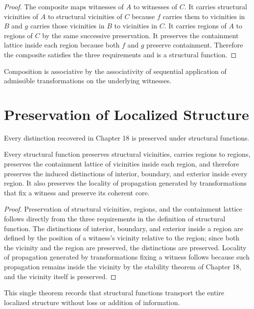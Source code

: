 \documentclass[12pt,anyside]{book}
\begin{document}
\begin{proof}
The composite maps witnesses of $A$ to witnesses of $C$. It carries structural vicinities of $A$ to structural vicinities of $C$ because $f$ carries them to vicinities in $B$ and $g$ carries those vicinities in $B$ to vicinities in $C$. It carries regions of $A$ to regions of $C$ by the same successive preservation. It preserves the containment lattice inside each region because both $f$ and $g$ preserve containment. Therefore the composite satisfies the three requirements and is a structural function.
\end{proof}

Composition is associative by the associativity of sequential application of admissible transformations on the underlying witnesses.

\section{Preservation of Localized Structure}
Every distinction recovered in Chapter 18 is preserved under structural functions.

\begin{theorem}
Every structural function preserves structural vicinities, carries regions to regions, preserves the containment lattice of vicinities inside each region, and therefore preserves the induced distinctions of interior, boundary, and exterior inside every region. It also preserves the locality of propagation generated by transformations that fix a witness and preserve its coherent core.
\end{theorem}

\begin{proof}
Preservation of structural vicinities, regions, and the containment lattice follows directly from the three requirements in the definition of structural function. The distinctions of interior, boundary, and exterior inside a region are defined by the position of a witness’s vicinity relative to the region; since both the vicinity and the region are preserved, the distinctions are preserved. Locality of propagation generated by transformations fixing a witness follows because such propagation remains inside the vicinity by the stability theorem of Chapter 18, and the vicinity itself is preserved.
\end{proof}

This single theorem records that structural functions transport the entire localized structure without loss or addition of information.
\end{document}

